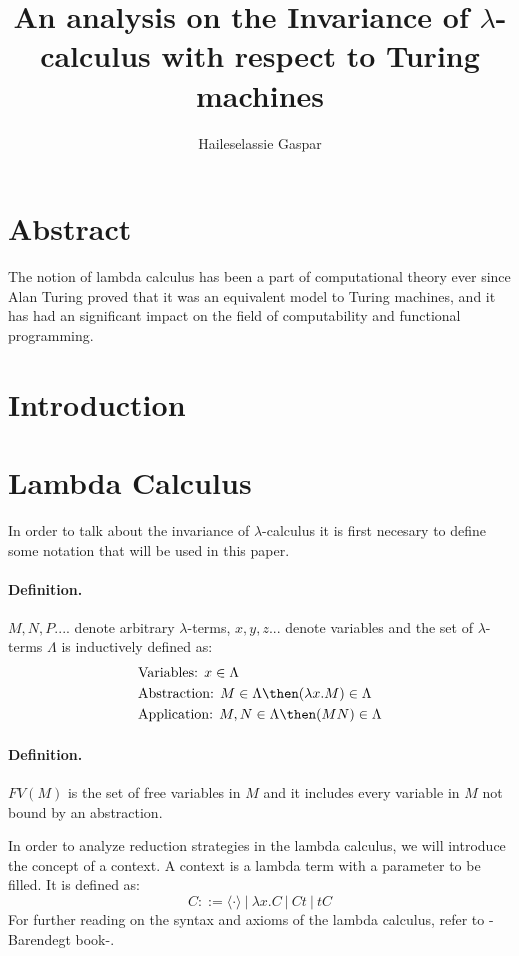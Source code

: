 \documentclass[12pt]{article}
\title{An analysis on the Invariance of $\lambda$-calculus with respect to Turing machines}
\author{Haileselassie Gaspar}
\begin{document}
\maketitle

\section{Abstract}
The notion of lambda calculus has been a part of computational theory ever since Alan Turing proved that it was an equivalent model to Turing machines, and it has had an significant impact on the field of computability and functional programming.
\section{Introduction}

\section{Lambda Calculus}
In order to talk about the invariance of $\lambda$-calculus it is first necesary to define some notation that will be used in this paper.
\paragraph{Definition.}$M, N, P....$ denote arbitrary $\lambda$-terms, $x,y,z...$ denote variables and
the set of $\lambda$-terms $\Lambda$ is inductively defined as:
\begin{equation}
  \begin{align}
  &\text{Variables: } x \in \Lambda \\
  &\text{Abstraction: }M \in \Lambda \then (\lambda x.M) \in \Lambda \\
  &\text{Application: }M, N \in \Lambda \then (MN) \in \Lambda
  \end{align}
\end{equation}

\paragraph{Definition.} $FV(M)$ is the set of free variables in $M$ and it includes every variable in $M$ not bound by an abstraction.

In order to analyze reduction strategies in the lambda calculus, we will introduce the concept of a context. A context is a lambda term with a parameter to be filled. It is defined as:
\begin{equation}
C ::= \langle \cdot \rangle \ | \ \lambda x.C \ | \ Ct \ | \ tC
\end{equation}
For further reading on the syntax and axioms of the lambda calculus, refer to -Barendegt book-.
\end{document}
